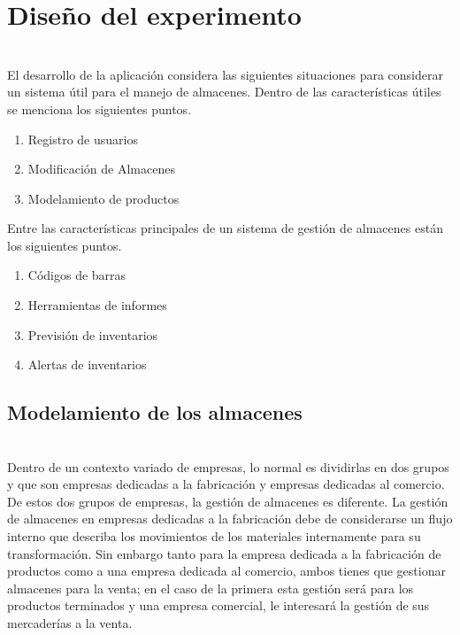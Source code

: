 

\chapter{Diseño del experimento}

\\
El desarrollo de la aplicación considera las siguientes situaciones para considerar un sistema útil para el manejo de almacenes. Dentro de las características útiles se menciona los siguientes puntos.

\begin{enumerate}
\item Registro de usuarios
\item Modificación de Almacenes
\item Modelamiento de productos
\end{enumerate}

Entre las características principales de un sistema de gestión de almacenes están los siguientes puntos.

\begin{enumerate}
\item Códigos de barras
\item Herramientas de informes
\item Previsión de inventarios
\item Alertas de inventarios
\end{enumerate}

\section{Modelamiento de los almacenes}

\\
Dentro de un contexto variado de empresas, lo normal es dividirlas en dos grupos y que son empresas dedicadas a la fabricación y empresas dedicadas al comercio. De estos dos grupos de empresas, la gestión de almacenes es diferente. La gestión de almacenes en empresas dedicadas a la fabricación debe de considerarse un flujo interno que describa los movimientos de los materiales internamente para su transformación. Sin embargo tanto para la empresa dedicada a la fabricación de productos como a una empresa dedicada al comercio, ambos tienes que gestionar almacenes para la venta; en el caso de la primera esta gestión será para los productos terminados y una empresa comercial, le interesará la gestión de sus mercaderías a la venta.\\

